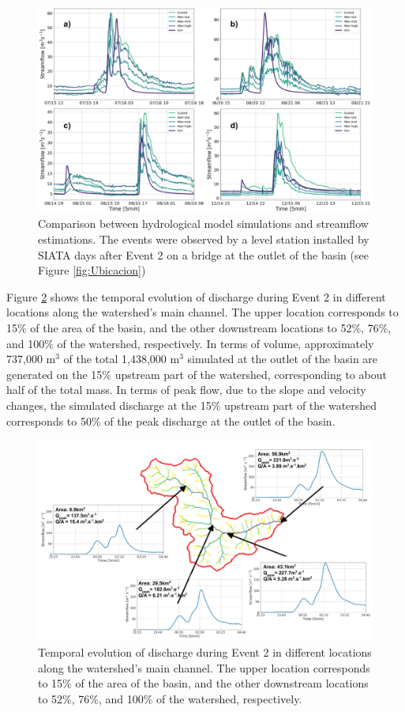 \documentclass[hess, manuscript]{copernicus}
\begin{document}
\begin{figure}[t]
\centering
 \includegraphics[width=14cm]{Figures/Eventos_Validacion.png}
 \caption{Comparison between hydrological model simulations and streamflow estimations. The events were observed by a level station installed by SIATA days after Event 2 on a bridge at the outlet of the basin (see Figure \ref{fig:Ubicacion})}
    \label{fig:validacion}
\end{figure}


Figure \ref{fig:dischargeEvent2} shows the temporal evolution of discharge during Event 2 in different locations along the watershed's main channel. The upper location corresponds to 15\% of the area of the basin, and the other downstream locations to 52\%, 76\%, and 100\% of the watershed, respectively. In terms of volume, approximately 737,000 m$^3$ of the total 1,438,000 m$^3$ simulated at the outlet of the basin are generated on the 15\% upstream part of the watershed,  corresponding to about half of the total mass. In terms of peak flow, due to the slope and velocity changes, the simulated discharge at the 15\% upstream part of the watershed corresponds to 50\% of the peak discharge at the outlet of the basin.\\


\begin{figure}[t]
\centering
\includegraphics[width =12cm]{Figures/Evolucion_evento.png}
\caption{Temporal evolution of discharge during Event 2 in different locations along the watershed's main channel. The upper location corresponds to 15\% of the area of the basin, and the other downstream locations to 52\%, 76\%, and 100\% of the watershed, respectively.}
\label{fig:dischargeEvent2}
\end{figure}
\end{document}
